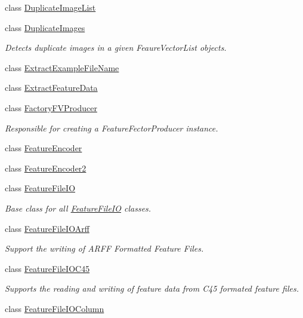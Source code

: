 \begin{DoxyCompactItemize}
\item 
class \hyperlink{class_k_k_m_l_l_1_1_duplicate_image_list}{Duplicate\+Image\+List}
\item 
class \hyperlink{class_k_k_m_l_l_1_1_duplicate_images}{Duplicate\+Images}
\begin{DoxyCompactList}\small\item\em Detects duplicate images in a given Feaure\+Vector\+List objects. \end{DoxyCompactList}\item 
class \hyperlink{class_k_k_m_l_l_1_1_extract_example_file_name}{Extract\+Example\+File\+Name}
\item 
class \hyperlink{class_k_k_m_l_l_1_1_extract_feature_data}{Extract\+Feature\+Data}
\item 
class \hyperlink{class_k_k_m_l_l_1_1_factory_f_v_producer}{Factory\+F\+V\+Producer}
\begin{DoxyCompactList}\small\item\em Responsible for creating a Feature\+Fector\+Producer instance. \end{DoxyCompactList}\item 
class \hyperlink{class_k_k_m_l_l_1_1_feature_encoder}{Feature\+Encoder}
\item 
class \hyperlink{class_k_k_m_l_l_1_1_feature_encoder2}{Feature\+Encoder2}
\item 
class \hyperlink{class_k_k_m_l_l_1_1_feature_file_i_o}{Feature\+File\+IO}
\begin{DoxyCompactList}\small\item\em Base class for all \hyperlink{class_k_k_m_l_l_1_1_feature_file_i_o}{Feature\+File\+IO} classes. \end{DoxyCompactList}\item 
class \hyperlink{class_k_k_m_l_l_1_1_feature_file_i_o_arff}{Feature\+File\+I\+O\+Arff}
\begin{DoxyCompactList}\small\item\em Support the writing of A\+R\+FF Formatted Feature Files. \end{DoxyCompactList}\item 
class \hyperlink{class_k_k_m_l_l_1_1_feature_file_i_o_c45}{Feature\+File\+I\+O\+C45}
\begin{DoxyCompactList}\small\item\em Supports the reading and writing of feature data from C45 formated feature files. \end{DoxyCompactList}\item 
class \hyperlink{class_k_k_m_l_l_1_1_feature_file_i_o_column}{Feature\+File\+I\+O\+Column}

\end{DoxyCompactItemize}
